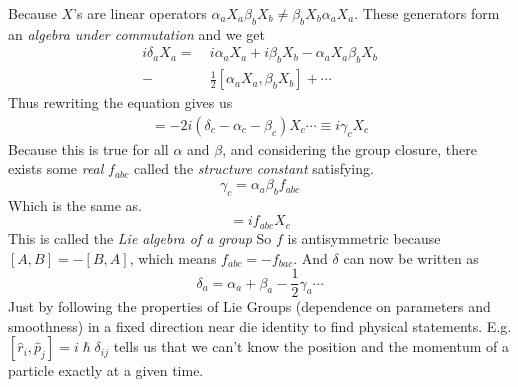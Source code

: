 \documentclass[a4paper]{article}
\theoremstyle{definition}
\theoremstyle{definition}
\theoremstyle{definition}
\theoremstyle{theorem}
\theoremstyle{theorem}
\theoremstyle{theorem}
\theoremstyle{definition}
\begin{document}
    Because $X$'s are linear operators $\alpha _a X_a \beta _b X_b \neq \beta _b X_b \alpha _a X_a$.
    These generators form an \textit{algebra under commutation} and we get
    \begin{align}
        i\delta _a X_a =&\ i\alpha _a X_a + i\beta _b X_b - \alpha_a X_a \beta _b X_b \\
                    -&\ \frac{1}{2}[\alpha _a X_a, \beta _b X_b] + \cdots
    \end{align}
    Thus rewriting the equation gives us
    \begin{align}
        [\alpha _a X_a, \beta _b X_b] = -2i(\delta _c -\alpha _c -\beta _c) X_c \cdots \equiv i\gamma _c X_c
    \end{align}
    Because this is true for all $\alpha$ and $\beta$, and considering the group closure, there exists some
    \textit{real} $f_{abc}$ called the \textit{structure constant} satisfying.
    \begin{equation}
        \gamma _c = \alpha _a \beta _b f_{abc}
    \end{equation}
    Which is the same as.
    \begin{equation}
        [X_a, X_b] = i f_{abc} X_c
    \end{equation}
    This is called the \textit{Lie algebra of a group}
    \newline
    \newline
    So $f$ is antisymmetric because $[A, B] = -[B, A]$, which means $f_{abc} = -f_{bac}$.
    \newline
    And $\delta$ can now be written as
    \begin{equation}
        \delta _a = \alpha _a + \beta _a - \frac{1}{2} \gamma _a \cdots
    \end{equation}
    Just by following the properties of Lie Groups (dependence on parameters and smoothness) in a fixed
    direction near die identity to find physical statements. E.g.
    $[\hat{r}_i, \hat{p}_j] = i \hslash \delta _{ij}$ tells us that we can't know the position
    and the momentum of a particle exactly at a given time.
\end{document}
